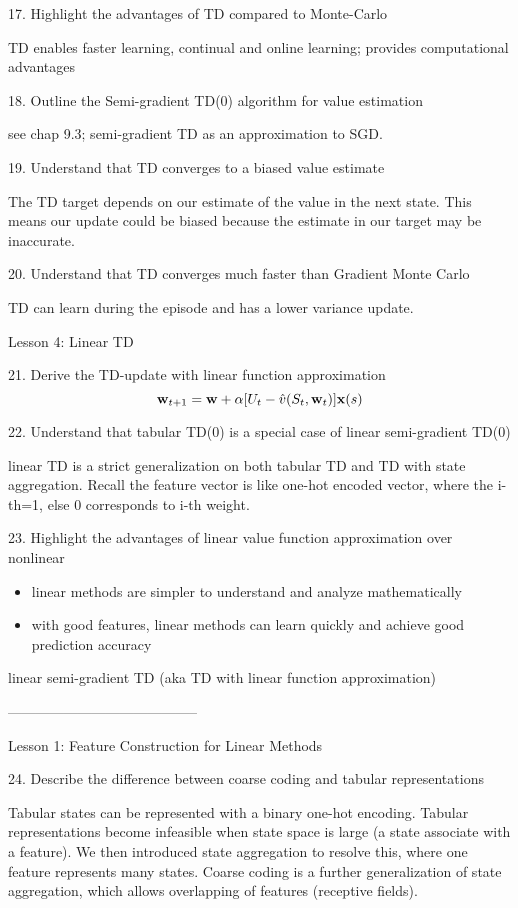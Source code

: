 \documentclass[sutton_barto_notes.tex]{subfiles}
\begin{document}
17. Highlight the advantages of TD compared to Monte-Carlo 

TD enables faster learning, continual and online learning; provides computational advantages

18. Outline the Semi-gradient TD(0) algorithm for value estimation 


see chap 9.3; semi-gradient TD as an approximation to SGD.

19. Understand that TD converges to a biased value estimate 

The TD target depends on our estimate of the value in the next state. This means our update could be biased because the estimate in our target may be inaccurate.

20. Understand that TD converges much faster than Gradient Monte Carlo 

TD can learn during the episode and has a lower variance update.

Lesson 4: Linear TD 

21. Derive the TD-update with linear function approximation 
$${\operatorname*{\mathbf{w}}}_{t+1} = {\operatorname*{\mathbf{w}}} + \alpha[U_t - \hat{v}(S_t, {\operatorname*{\mathbf{w}}}_t)]{\operatorname*{\mathbf{x}}}(s)$$

22. Understand that tabular TD(0) is a special case of linear semi-gradient TD(0)

linear TD is a strict generalization on both tabular TD and TD with state aggregation. Recall the feature vector is like one-hot encoded vector, where the i-th=1, else 0 corresponds to i-th weight. 

23. Highlight the advantages of linear value function approximation over nonlinear 

\begin{itemize}
\item linear methods are simpler to understand and analyze mathematically
\item with good features, linear methods can learn quickly and achieve good prediction accuracy
\end{itemize}

linear semi-gradient TD (aka TD with linear function approximation)

-----------------------------------------

Lesson 1: Feature Construction for Linear Methods 

24. Describe the difference between coarse coding and tabular representations 

Tabular states can be represented with a binary one-hot encoding. Tabular representations become infeasible when state space is large (a state associate with a feature). We then introduced state aggregation to resolve this, where one feature represents many states.
Coarse coding is a further generalization of state aggregation, which allows overlapping of features (receptive fields).
\end{document}
